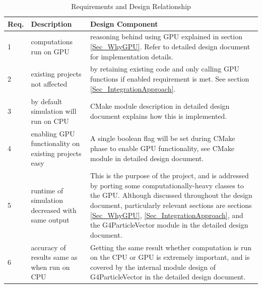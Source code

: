 \documentclass[12pt]{article}
\begin{document}
\begin{center}
\begin{longtable}{>{\raggedright\arraybackslash}p{}>{\raggedright\arraybackslash}p{}>{\raggedright\arraybackslash}p{}}

\caption{Requirements and Design Relationship}\label{Table_RequirementsAndDesign}
\\\toprule
\bf Req. & \bf Description & \bf Design Component\\\toprule
\arrayrulecolor{lightgray}

1  & computations run on GPU & reasoning behind using GPU explained in section \ref{Sec_WhyGPU}. Refer to detailed design document for implementation details.\\\hline

2  & existing projects not affected & by retaining existing code and only calling GPU functions if enabled requirement is met. See section \ref{Sec_IntegrationApproach}.\\\hline

3  & by default simulation will run on CPU & CMake module description in detailed design document explains how this is implemented.\\\hline



4  & enabling GPU functionality on existing projects easy & A single boolean flag will be set during CMake phase to enable GPU functionality, see CMake module in detailed design document.\\\hline

5 & runtime of simulation decreased with same output & This is the purpose of the project, and is addressed by porting some computationally-heavy classes to the GPU. Although discussed throughout the design document, particularly relevant sections are sections \ref{Sec_WhyGPU}, \ref{Sec_IntegrationApproach}, and the G4ParticleVector module in the detailed design document.\\\hline

6 & accuracy of results same as when run on CPU & Getting the same result whether computation is run on the CPU or GPU is extremely important, and is covered by the internal module design of G4ParticleVector in the detailed design document.\\\hline


\end{longtable}
\end{center}
\end{document}
